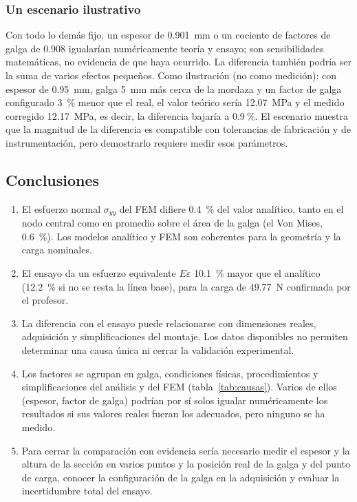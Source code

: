 \documentclass[11pt,a4paper]{article}
\begin{document}
\subsubsection{Un escenario ilustrativo}
Con todo lo dem\'as fijo, un espesor de \SI{0,901}{mm} o un cociente de factores de galga de \num{0,908} igualar\'ian num\'ericamente teor\'ia y ensayo; son sensibilidades matem\'aticas, no evidencia de que haya ocurrido. La diferencia tambi\'en podr\'ia ser la suma de varios efectos peque\~nos. Como ilustraci\'on (no como medici\'on): con espesor de \SI{0,95}{mm}, galga \SI{5}{mm} m\'as cerca de la mordaza y un factor de galga configurado \SI{3}{\percent} menor que el real, el valor te\'orico ser\'ia \SI{12,07}{MPa} y el medido corregido \SI{12,17}{MPa}, es decir, la diferencia bajar\'ia a $\SI{+0,9}{\percent}$. El escenario muestra que la magnitud de la diferencia es compatible con tolerancias de fabricaci\'on y de instrumentaci\'on, pero demostrarlo requiere medir esos par\'ametros.

\subsection{Conclusiones}
\begin{enumerate}
\item El esfuerzo normal $\sigma_{yy}$ del FEM difiere \SI{+0,4}{\percent} del valor anal\'itico, tanto en el nodo central como en promedio sobre el \'area de la galga (el Von Mises, \SI{+0,6}{\percent}). Los modelos anal\'itico y FEM son coherentes para la geometr\'ia y la carga nominales.
\item El ensayo da un esfuerzo equivalente $E\varepsilon$ \SI{10,1}{\percent} mayor que el anal\'itico (\SI{12,2}{\percent} si no se resta la l\'inea base), para la carga de \SI{49,77}{N} confirmada por el profesor.
\item La diferencia con el ensayo puede relacionarse con dimensiones reales, adquisici\'on y simplificaciones del montaje. Los datos disponibles no permiten determinar una causa \'unica ni cerrar la validaci\'on experimental.
\item Los factores se agrupan en galga, condiciones f\'isicas, procedimientos y simplificaciones del an\'alisis y del FEM (tabla~\ref{tab:causas}). Varios de ellos (espesor, factor de galga) podr\'ian por s\'i solos igualar num\'ericamente los resultados si sus valores reales fueran los adecuados, pero ninguno se ha medido.
\item Para cerrar la comparaci\'on con evidencia ser\'ia necesario medir el espesor y la altura de la secci\'on en varios puntos y la posici\'on real de la galga y del punto de carga, conocer la configuraci\'on de la galga en la adquisici\'on y evaluar la incertidumbre total del ensayo.
\end{enumerate}
\end{document}
